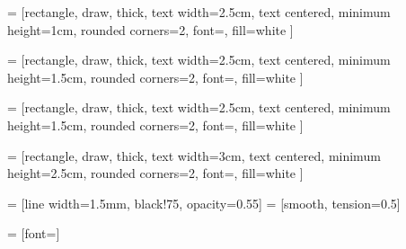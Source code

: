  = [rectangle, draw, thick,
                    text width=2.5cm, text centered, minimum height=1cm,
                    rounded corners=2, font=\footnotesize, fill=white ]

 = [rectangle, draw, thick,
                    text width=2.5cm, text centered, minimum height=1.5cm,
                    rounded corners=2, font=\footnotesize, fill=white ]

 = [rectangle, draw, thick,
                    text width=2.5cm, text centered, minimum height=1.5cm,
                    rounded corners=2, font=\footnotesize, fill=white ]

 = [rectangle, draw, thick, 
                    text width=3cm, text centered, minimum height=2.5cm,
                    rounded corners=2, font=\footnotesize, fill=white ]

 = [line width=1.5mm, black!75, opacity=0.55] %
 = [smooth, tension=0.5]

 = [font=\footnotesize]

